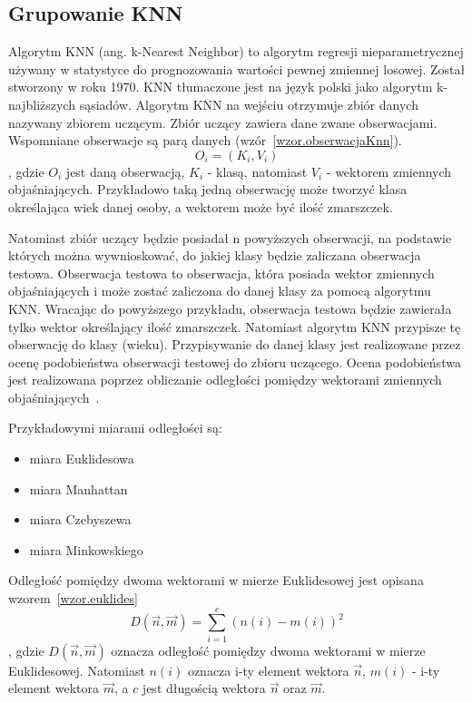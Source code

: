 \documentclass[a4paper,twoside,12pt]{book}
\begin{document}
    \subsection{Grupowanie KNN}\label{subsec:grupowanie-knn}
    Algorytm KNN (ang. k-Nearest Neighbor) to algorytm regresji
    nieparametrycznej używany w statystyce do
    prognozowania wartości pewnej zmiennej losowej. Został stworzony w roku 1970.
    KNN tłumaczone jest na język polski jako algorytm k- najbliższych sąsiadów.
    Algorytm KNN na wejściu otrzymuje zbiór danych nazywany zbiorem uczącym.
    Zbiór uczący zawiera dane zwane obserwacjami. Wspomniane obserwacje są parą danych (wzór~\ref{wzor.obserwacjaKnn}).
    \large
    \begin{equation}
        O_{i} = (K_{i}, V_{i})
        \label{wzor.obserwacjaKnn}
    \end{equation}
    \normalsize
    , gdzie $O_{i}$ jest daną obserwacją, $K_{i}$ - klasą, natomiast $V_{i}$ - wektorem zmiennych objaśniających.
    Przykładowo taką jedną obserwację może tworzyć klasa określająca wiek danej osoby, a wektorem może być ilość
    zmarszczek.

    Natomiast zbiór uczący będzie posiadał n powyższych obserwacji, na podstawie których można wywnioskować, do jakiej
    klasy będzie zaliczana obserwacja testowa. Obserwacja testowa to obserwacja, która posiada wektor zmiennych
    objaśniających i może zostać zaliczona do danej klasy za pomocą algorytmu KNN.
    Wracając do powyższego przykładu, obserwacja testowa będzie zawierała tylko wektor określający ilość zmarszczek.
    Natomiast algorytm KNN przypisze tę obserwację do klasy (wieku).
    Przypisywanie do danej klasy jest realizowane przez ocenę podobieństwa obserwacji testowej do zbioru uczącego.
    Ocena podobieństwa jest realizowana poprzez obliczanie odległości pomiędzy wektorami zmiennych
    objaśniających~\cite{knnOpis}.

    Przykładowymi miarami odległości są:
    \begin{itemize}
        \item miara Euklidesowa
        \item miara Manhattan
        \item miara Czebyszewa
        \item miara Minkowskiego
    \end{itemize}
    Odległość pomiędzy dwoma wektorami w mierze Euklidesowej jest opisana wzorem~\ref{wzor.euklides}
    \large
    \begin{equation}
        D(\overrightarrow{n},\overrightarrow{m})=\sum_{i=1}^{c}(n(i)-m(i))^{2}
        \label{wzor.euklides}
    \end{equation}
    \normalsize
    , gdzie $D(\overrightarrow{n},\overrightarrow{m})$ oznacza odległość pomiędzy dwoma wektorami w mierze Euklidesowej.
    Natomiast $n(i)$ oznacza i-ty element wektora $\overrightarrow{n}$,  $m(i)$ - i-ty element wektora
    $\overrightarrow{m}$, a $c$ jest długością wektora  $\overrightarrow{n}$ oraz $\overrightarrow{m}$.
\end{document}

